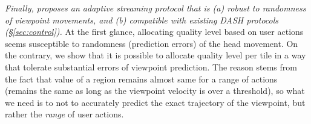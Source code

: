 \vspace{0.1cm}
{\em Finally, \name proposes an adaptive streaming protocol that is (a) robust to randomness of viewpoint movements, and (b) compatible with existing DASH protocols (\S\ref{sec:control}).}
At the first glance, allocating quality level based on user actions seems susceptible to randomness (\ie prediction errors) of the head movement. 
On the contrary, we show that it is possible to allocate quality level per tile in a way that tolerate substantial errors of viewpoint prediction. 
The reason stems from the fact that \vrjnd value of a region remains almost same for a range of actions (\eg \vrjnd remains the same as long as the viewpoint velocity is over a threshold), so what we need is to not to accurately predict the exact trajectory of the viewpoint, but rather the {\em range} of user actions.

